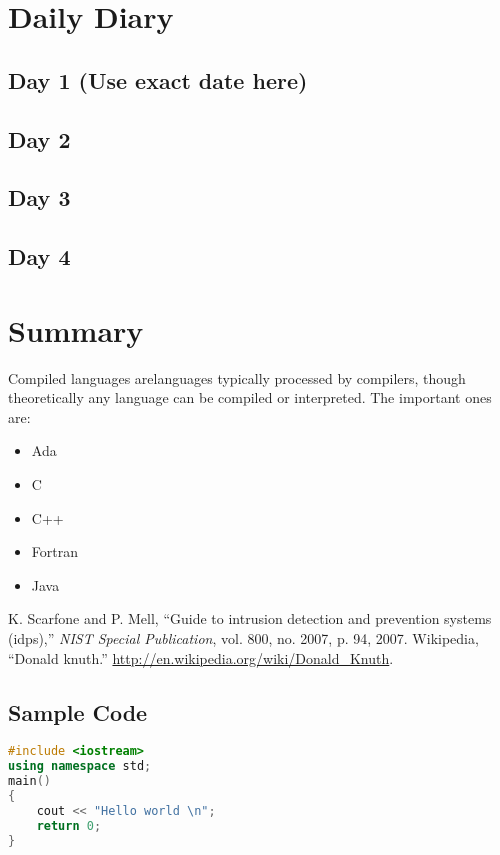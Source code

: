 \documentclass{fisattraining}
\begin{document}
\chapter{Daily Diary}


\section{Day 1 (Use exact date here)}

\section{Day 2}

\section{Day 3}

\section{Day 4}

\chapter{Summary}

Compiled languages arelanguages typically processed by compilers, though theoretically any language can be compiled or interpreted. The important ones are:
\begin{itemize}
\item Ada
\item C
\item C++
\item Fortran
\item Java
\end{itemize}



\begin{thebibliography}{1}
 K. Scarfone and P. Mell, ``Guide to intrusion detection and prevention systems
(idps),'' \textit{NIST Special Publication}, vol. 800, no. 2007, p. 94, 2007.
 Wikipedia, ``Donald knuth.'' \url{http://en.wikipedia.org/wiki/Donald_Knuth}.
\end{thebibliography}

\begin{appendices}
\chapter{Sample Code}
\begin{lstlisting}[language=c++]
#include <iostream>
using namespace std;
main()
{
	cout << "Hello world \n";
	return 0;
}
\end{lstlisting}
\end{appendices}
\end{document}
